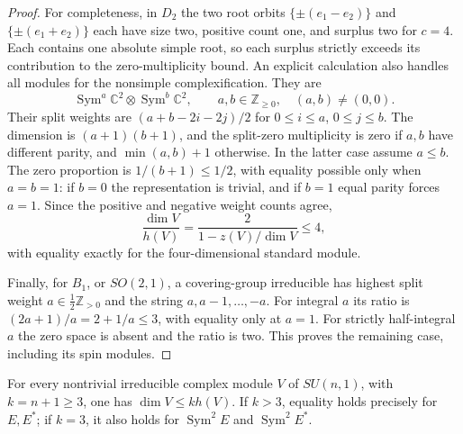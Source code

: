 \begin{proof}
For completeness, in $D_2$ the two root orbits
$\{\pm(e_1-e_2)\}$ and $\{\pm(e_1+e_2)\}$ each have
size two, positive count one, and surplus two for $c=4$.
Each contains one absolute simple root, so each surplus strictly
exceeds its contribution to the zero-multiplicity bound. An explicit
calculation also handles all modules for the nonsimple complexification.
They are
\[
 \operatorname{Sym}^a\mathbb C^2\otimes
 \operatorname{Sym}^b\mathbb C^2,
 \qquad a,b\in\mathbb Z_{\geq0},\quad (a,b)\neq(0,0).
\]
Their split weights are
$(a+b-2i-2j)/2$ for $0\leq i\leq a$, $0\leq j\leq b$.
The dimension is $(a+1)(b+1)$, and the split-zero multiplicity is
zero if $a,b$ have different parity, and $\min(a,b)+1$ otherwise.
In the latter case assume $a\leq b$. The zero proportion is
$1/(b+1)\leq1/2$, with equality possible only when $a=b=1$:
if $b=0$ the representation is trivial, and if $b=1$ equal parity
forces $a=1$. Since the positive and negative weight counts agree,
\[
 \frac{\dim V}{h(V)}
 =\frac{2}{1-z(V)/\dim V}\leq4,
\]
with equality exactly for the four-dimensional standard module.

Finally, for $B_1$, or $SO(2,1)$, a covering-group irreducible has
highest split weight $a\in\frac12\mathbb Z_{>0}$ and the string
$a,a-1,\ldots,-a$. For integral $a$ its ratio is
$(2a+1)/a=2+1/a\leq3$, with equality only at $a=1$.
For strictly half-integral $a$ the zero space is absent and the
ratio is two. This proves the remaining case, including its spin
modules.
\end{proof}

\begin{lemma}\label{lem:panels-unitary-ratio}
For every nontrivial irreducible complex module $V$ of $SU(n,1)$,
with $k=n+1\geq3$, one has $\dim V\leq k h(V)$.
If $k>3$, equality holds precisely for $E,E^*$; if $k=3$, it
also holds for $\operatorname{Sym}^2E$ and
$\operatorname{Sym}^2E^*$.
\end{lemma}


